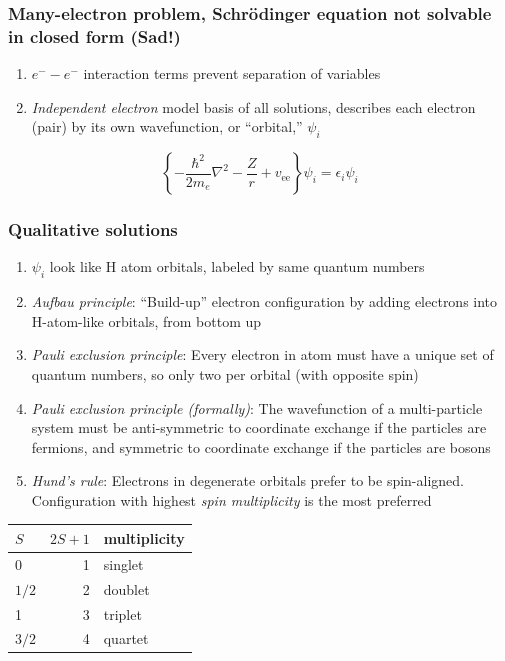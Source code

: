 \documentclass[11pt]{article}
\begin{document}
\subsubsection{Many-electron problem, Schr\"{o}dinger equation not solvable in closed form (Sad!)}
\label{sec:org80ace9e}
\begin{enumerate}
\item \(e^- -e^-\) interaction terms prevent separation of variables
\item \emph{Independent electron} model basis of all solutions, describes each electron (pair) by its own wavefunction, or ``orbital,'' \(\psi_i\)
\end{enumerate}
\[ \left \{ -\frac{\hbar^2}{2m_e}\nabla^2 - \frac{Z}{r} + v_\text{ee} \right \}\psi_i = \epsilon_i \psi_i \]
\subsubsection{Qualitative solutions}
\label{sec:org7cf19e2}
\begin{enumerate}
\item \(\psi_i\) look like H atom orbitals,  labeled by same quantum numbers
\item \emph{Aufbau principle}: ``Build-up'' electron configuration by adding electrons into H-atom-like orbitals, from bottom up
\item \emph{Pauli exclusion principle}: Every electron in atom must have a unique set of quantum numbers, so only two per orbital (with opposite spin)
\item \emph{Pauli exclusion principle (formally)}: The wavefunction of a multi-particle system must be anti-symmetric to coordinate exchange if the particles are fermions, and symmetric to coordinate exchange if the particles are bosons
\item \emph{Hund's rule}: Electrons in degenerate orbitals prefer to be spin-aligned.  Configuration with highest \emph{spin multiplicity} is the most preferred
\end{enumerate}
\begin{center}
\begin{tabular}{lrl}
\(S\) & \(2S+1\) & multiplicity\\
\hline
0 & 1 & singlet\\
\(1/2\) & 2 & doublet\\
1 & 3 & triplet\\
\(3/2\) & 4 & quartet\\
\end{tabular}
\end{center}
\end{document}
